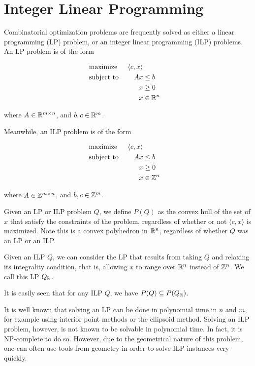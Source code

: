 \chapter{Integer Linear Programming}
\label{app:ilp}
Combinatorial optimization problems are frequently solved as either a linear programming (LP) problem, or an integer linear programming (ILP) problems. An LP problem is of the form

\begin{align*}
&\text{maximize }  & \langle c, x \rangle\\
&\text{subject to }& Ax &\le b&\\
&                  & x &\ge 0&\\
&                  & x &\in \mathbb{R}^n&
\end{align*}

\noindent where $A \in \mathbb{R}^{m \times n}$, and $b, c \in \mathbb{R}^m$.

Meanwhile, an ILP problem is of the form

\begin{align*}
&\text{maximize }  & \langle c, x \rangle\\
&\text{subject to }& Ax &\le b&\\
&                  & x &\ge 0&\\
&                  & x &\in \mathbb{Z}^n&
\end{align*}

\noindent where $A \in \mathbb{Z}^{m \times n}$, and $b, c \in \mathbb{Z}^m$.

Given an LP or ILP problem $Q$, we define $P(Q)$ as the convex hull of the set of $x$ that satisfy the constraints of the problem, regardless of whether or not $\langle c, x \rangle$ is maximized. Note this is a convex polyhedron in $\mathbb{R}^n$, regardless of whether $Q$ was an LP or an ILP.

Given an ILP $Q$, we can consider the LP that results from taking $Q$ and relaxing its integrality condition, that is, allowing $x$ to range over $\mathbb{R}^n$ instead of $\mathbb{Z}^n$. We call this LP $Q_{\mathbb{R}}$.

It is easily seen that for any ILP $Q$, we have $P(Q) \subseteq P(Q_{\mathbb{R}})$.

It is well known that solving an LP can be done in polynomial time in $n$ and $m$\cite{lp}, for example using interior point methods or the ellipsoid method. Solving an ILP problem, however, is not known to be solvable in polynomial time. In fact, it is NP-complete to do so\cite{Garey:1990:CIG:574848}. However, due to the geometrical nature of this problem, one can often use tools from geometry in order to solve ILP instances very quickly.

